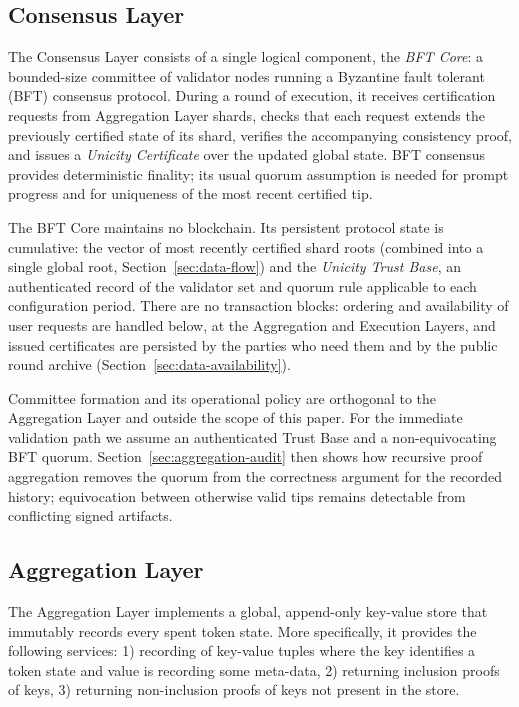 \documentclass[11pt]{article}
\begin{document}
\subsection{Consensus Layer}
\label{sec:consensus-layer}

The Consensus Layer consists of a single logical component, the \emph{BFT Core}: a bounded-size committee of validator nodes running a Byzantine fault tolerant (BFT) consensus protocol. During a round of execution, it receives certification requests from Aggregation Layer shards, checks that each request extends the previously certified state of its shard, verifies the accompanying consistency proof, and issues a \emph{Unicity Certificate} over the updated global state. BFT consensus provides deterministic finality; its usual quorum assumption is needed for prompt progress and for uniqueness of the most recent certified tip.

The BFT Core maintains no blockchain. Its persistent protocol state is cumulative: the vector of most recently certified shard roots (combined into a single global root, Section~\ref{sec:data-flow}) and the \emph{Unicity Trust Base}, an authenticated record of the validator set and quorum rule applicable to each configuration period. There are no transaction blocks: ordering and availability of user requests are handled below, at the Aggregation and Execution Layers, and issued certificates are persisted by the parties who need them and by the public round archive (Section~\ref{sec:data-availability}).

Committee formation and its operational policy are orthogonal to the Aggregation Layer and outside the scope of this paper. For the immediate validation path we assume an authenticated Trust Base and a non-equivocating BFT quorum. Section~\ref{sec:aggregation-audit} then shows how recursive proof aggregation removes the quorum from the correctness argument for the recorded history; equivocation between otherwise valid tips remains detectable from conflicting signed artifacts.

\subsection{Aggregation Layer}
\label{sec:sharding-architecture}

The Aggregation Layer implements a global, append-only key-value store that immutably records every spent token state. More specifically, it provides the following services: 1) recording of key-value tuples where the key identifies a token state and value is recording some meta-data, 2) returning inclusion proofs of keys, 3) returning non-inclusion proofs of keys not present in the store.
\end{document}
